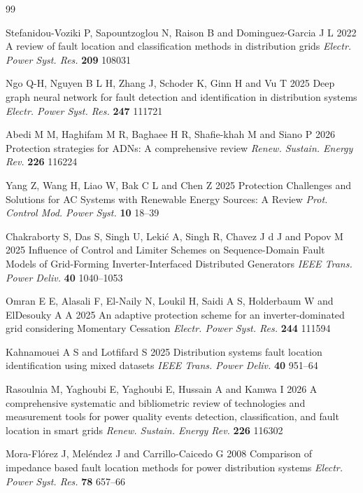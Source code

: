 \documentclass[11pt]{article}
\newcommand{\hlnew}[1]{#1}
\begin{document}
\begin{thebibliography}{99}

 Stefanidou-Voziki P, Sapountzoglou N, Raison B and Dominguez-Garcia J L 2022 A review of fault location and classification methods in distribution grids \textit{Electr. Power Syst. Res.} \textbf{209} 108031

 \hlnew{Ngo Q-H, Nguyen B L H, Zhang J, Schoder K, Ginn H and Vu T 2025 Deep graph neural network for fault detection and identification in distribution systems \textit{Electr. Power Syst. Res.} \textbf{247} 111721}

 \hlnew{Abedi M M, Haghifam M R, Baghaee H R, Shafie-khah M and Siano P 2026 Protection strategies for ADNs: A comprehensive review \textit{Renew. Sustain. Energy Rev.} \textbf{226} 116224}

 \hlnew{Yang Z, Wang H, Liao W, Bak C L and Chen Z 2025 Protection Challenges and Solutions for AC Systems with Renewable Energy Sources: A Review \textit{Prot. Control Mod. Power Syst.} \textbf{10} 18--39}

 \hlnew{Chakraborty S, Das S, Singh U, Leki{\'c} A, Singh R, Chavez J d J and Popov M 2025 Influence of Control and Limiter Schemes on Sequence-Domain Fault Models of Grid-Forming Inverter-Interfaced Distributed Generators \textit{IEEE Trans. Power Deliv.} \textbf{40} 1040--1053}

 \hlnew{Omran E E, Alasali F, El-Naily N, Loukil H, Saidi A S, Holderbaum W and ElDesouky A A 2025 An adaptive protection scheme for an inverter-dominated grid considering Momentary Cessation \textit{Electr. Power Syst. Res.} \textbf{244} 111594}

 \hlnew{Kahnamouei A S and Lotfifard S 2025 Distribution systems fault location identification using mixed datasets \textit{IEEE Trans. Power Deliv.} \textbf{40} 951--64}

 \hlnew{Rasoulnia M, Yaghoubi E, Yaghoubi E, Hussain A and Kamwa I 2026 A comprehensive systematic and bibliometric review of technologies and measurement tools for power quality events detection, classification, and fault location in smart grids \textit{Renew. Sustain. Energy Rev.} \textbf{226} 116302}

 Mora-Fl\'orez J, Mel\'endez J and Carrillo-Caicedo G 2008 Comparison of impedance based fault location methods for power distribution systems \textit{Electr. Power Syst. Res.} \textbf{78} 657--66


\end{thebibliography}
\end{document}
